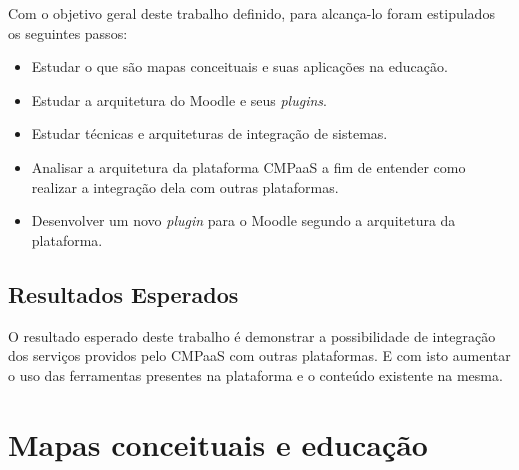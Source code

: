 \documentclass[
	12pt,				%
	openright,			%
	oneside,			%
	a4paper,			%
	english,			%
	french,				%
	spanish,			%
	brazil				%
	]{abntex2}
\begin{document}
Com o objetivo geral deste trabalho definido, para alcança-lo foram estipulados os seguintes passos:

\begin{itemize}
	\item Estudar o que são mapas conceituais e suas aplicações na educação.
	\item Estudar a arquitetura do Moodle e seus \textit{plugins}.
	\item Estudar técnicas e arquiteturas de integração de sistemas.
	\item Analisar a arquitetura da plataforma CMPaaS a fim de entender como realizar a integração dela com outras plataformas.
	\item Desenvolver um novo \textit{plugin} para o Moodle segundo a arquitetura da plataforma.   
\end{itemize} 
 
\section{Resultados Esperados}

O resultado esperado deste trabalho é demonstrar a possibilidade de integração dos serviços providos pelo CMPaaS com outras plataformas. E com isto aumentar o uso das ferramentas presentes na plataforma e o conteúdo existente na mesma. 




\chapter{Mapas conceituais e educação}\label{cap-maps}
\end{document}
